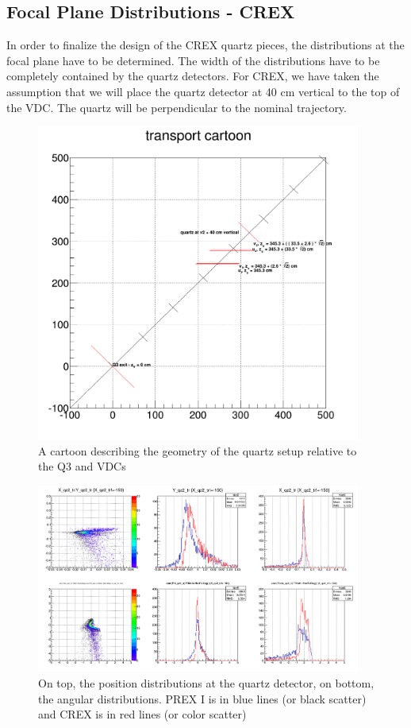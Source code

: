 \documentclass[11pt]{amsart}
\begin{document}
\FloatBarrier

\subsection{ Focal Plane Distributions - CREX}

In order to finalize the design of the CREX quartz pieces, the distributions at the focal plane have to be determined. The width of the distributions have to be completely contained by the quartz detectors. For CREX, we have taken the assumption that we will place the quartz detector at 40 cm vertical to the top of the VDC. The quartz will be perpendicular to the nominal trajectory. 

\FloatBarrier
\begin{figure}
\includegraphics[width=0.95\textwidth]{plots/transportcartoon.png}
\caption{A cartoon describing the geometry of the quartz setup relative to the Q3 and VDCs}
\end{figure}

\begin{figure}
\includegraphics[width=0.95\textwidth]{plots/crex_footprint.png}
\caption{On top, the position distributions at the quartz detector, on bottom, the angular distributions. PREX I is in blue lines (or black scatter) and CREX is in red lines (or color scatter)}
\end{figure}
\end{document}
